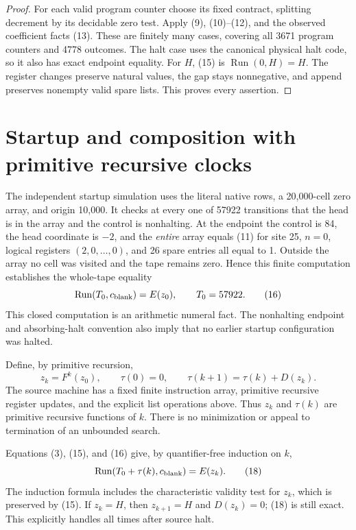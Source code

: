 \documentclass[11pt]{article}
\newcommand{\Run}{\operatorname{Run}}
\begin{document}
\begin{proof}
For each valid program counter choose its fixed contract, splitting
decrement by its decidable zero test.  Apply (9), (10)--(12), and the
observed coefficient facts (13).  These are finitely many cases, covering
all 3671 program counters and 4778 outcomes.  The halt case uses the
canonical physical halt code, so it also has exact endpoint equality.
For $H$, (15) is $\Run(0,H)=H$.  The register changes preserve natural
values, the gap stays nonnegative, and append preserves nonempty valid
spare lists.  This proves every assertion.
\end{proof}

\section{Startup and composition with primitive recursive clocks}

The independent startup simulation uses the literal native rows, a
20,000-cell zero array, and origin 10,000.  It checks at every one of
57922 transitions that the head is in the array and the control is
nonhalting.  At the endpoint the control is 84, the head coordinate is
$-2$, and the \emph{entire} array equals (11) for site 25, $n=0$,
logical registers $(2,0,\ldots,0)$, and 26 spare entries all equal to 1.
Outside the array no cell was visited and the tape remains zero.
Hence this finite computation establishes the whole-tape equality
\[
 \Run(T_0,c_{\rm blank})=E(z_0),\qquad T_0=57922.                \tag{16}
\]
This closed computation is an arithmetic numeral fact.  The nonhalting
endpoint and absorbing-halt convention also imply that no earlier
startup configuration was halted.

Define, by primitive recursion,
\[
 z_k=F^k(z_0),\qquad
 \tau(0)=0,\qquad \tau(k+1)=\tau(k)+D(z_k).                      \tag{17}
\]
The source machine has a fixed finite instruction array, primitive
recursive register updates, and the explicit list operations above.
Thus $z_k$ and $\tau(k)$ are primitive recursive functions of $k$.
There is no minimization or appeal to termination of an unbounded search.

Equations (3), (15), and (16) give, by quantifier-free induction on $k$,
\[
 \Run(T_0+\tau(k),c_{\rm blank})=E(z_k).                         \tag{18}
\]
The induction formula includes the characteristic validity test for
$z_k$, which is preserved by (15).  If $z_k=H$, then $z_{k+1}=H$ and
$D(z_k)=0$; (18) is still exact.  This explicitly handles all times
after source halt.
\end{document}
